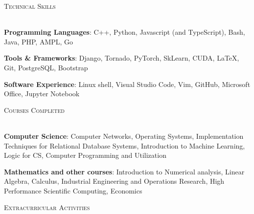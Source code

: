 \documentclass[11pt]{article}
\renewcommand{\section}[1]{
    \vspace*{8pt}
    \textsc{\LARGE{#1}}
    \vspace*{-10pt} \\ \hspace*{-5pt} 
    \hrulefill \\
    \vspace*{-15pt}
    \vspace*{-8pt}
}
\newcommand{\smallbullet}{
    \small$\bullet$
}
\newenvironment{bullet-list-major}{
    \vspace*{8pt}
    \begin{list}{
        \smallbullet
    }{
        \setlength\leftmargin{15pt}\topsep -5pt \itemsep -6pt
    }
} {
    \end{list}
}
\begin{document}

    \section{Technical Skills}

    \begin{bullet-list-major}
        \item \textbf{Programming Languages}: C++, Python, Javascript (and TypeScript), Bash, Java, PHP, AMPL, Go
        \item \textbf{Tools \& Frameworks}: Django, Tornado, PyTorch, SkLearn, CUDA, LaTeX, Git, PostgreSQL, Bootstrap
        \item \textbf{Software Experience}: Linux shell, Visual Studio Code, Vim, GitHub, Microsoft Office, Jupyter Notebook
    \end{bullet-list-major}


    \section{Courses Completed}

    \begin{bullet-list-major}
        \item \textbf{Computer Science}: Computer Networks, Operating Systems, Implementation Techniques for
        Relational Database Systems, Introduction to Machine Learning, Logic for CS, Computer
        Programming and Utilization
        \item \textbf{Mathematics and other courses}: Introduction to Numerical analysis, Linear Algebra, Calculus, Industrial Engineering and Operations Research, High Performance Scientific Computing, Economics
    \end{bullet-list-major}


    \section{Extracurricular Activities}
\end{document}
